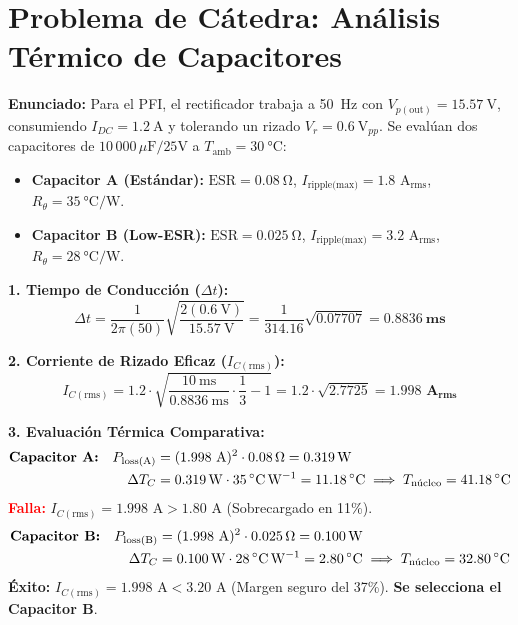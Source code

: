 \documentclass[11pt, a4paper]{article}
\begin{document}
\section{Problema de Cátedra: Análisis Térmico de Capacitores}
\textbf{Enunciado:} Para el PFI, el rectificador trabaja a \qty{50}{\hertz} con $V_{p(\text{out})} = \qty{15.57}{\volt}$, consumiendo $I_{DC} = \qty{1.2}{\ampere}$ y tolerando un rizado $V_r = \qty{0.6}{\volt}_{pp}$. Se evalúan dos capacitores de $10\,000\,\mu\text{F} / 25\text{V}$ a $T_{\text{amb}} = \qty{30}{\celsius}$:
\begin{itemize}
    \item \textbf{Capacitor A (Estándar):} $\text{ESR} = \qty{0.08}{\ohm}$, $I_{\text{ripple(max)}} = 1.8\text{ A}_{\text{rms}}$, $R_\theta = \qty{35}{\celsius\per\watt}$.
    \item \textbf{Capacitor B (Low-ESR):} $\text{ESR} = \qty{0.025}{\ohm}$, $I_{\text{ripple(max)}} = 3.2\text{ A}_{\text{rms}}$, $R_\theta = \qty{28}{\celsius\per\watt}$.
\end{itemize}

\vspace{0.3cm}
\noindent \textbf{1. Tiempo de Conducción ($\Delta t$):}
\begin{equation*}
    \Delta t = \frac{1}{2\pi (50)} \sqrt{\frac{2(\qty{0.6}{\volt})}{\qty{15.57}{\volt}}} = \frac{1}{314.16} \sqrt{0.07707} = \mathbf{\qty{0.8836}{\milli\second}}
\end{equation*}

\noindent \textbf{2. Corriente de Rizado Eficaz ($I_{C(\text{rms})}$):}
\begin{equation*}
    I_{C(\text{rms})} = 1.2 \cdot \sqrt{\frac{\qty{10}{\milli\second}}{\qty{0.8836}{\milli\second}} \cdot \frac{1}{3} - 1} = 1.2 \cdot \sqrt{2.7725} = \mathbf{1.998\text{ A}_{\text{rms}}}
\end{equation*}

\noindent \textbf{3. Evaluación Térmica Comparativa:}
\begin{align*}
    \text{\textbf{Capacitor A:}} \quad P_{\text{loss(A)}} &= (1.998\text{ A})^2 \cdot \qty{0.08}{\ohm} = \mathbf{\qty{0.319}{\watt}} \\
    \Delta T_C &= \qty{0.319}{\watt} \cdot \qty{35}{\celsius\per\watt} = \qty{11.18}{\celsius} \implies T_{\text{núcleo}} = \mathbf{\qty{41.18}{\celsius}}
\end{align*}
\textcolor{red}{\textbf{Falla:}} $I_{C(\text{rms})} = 1.998\text{ A} > 1.80\text{ A}$ (Sobrecargado en 11\%).
\begin{align*}
    \text{\textbf{Capacitor B:}} \quad P_{\text{loss(B)}} &= (1.998\text{ A})^2 \cdot \qty{0.025}{\ohm} = \mathbf{\qty{0.100}{\watt}} \\
    \Delta T_C &= \qty{0.100}{\watt} \cdot \qty{28}{\celsius\per\watt} = \qty{2.80}{\celsius} \implies T_{\text{núcleo}} = \mathbf{\qty{32.80}{\celsius}}
\end{align*}
\textcolor{codegreen}{\textbf{Éxito:}} $I_{C(\text{rms})} = 1.998\text{ A} < 3.20\text{ A}$ (Margen seguro del 37\%). \textbf{Se selecciona el Capacitor B}.
\end{document}
